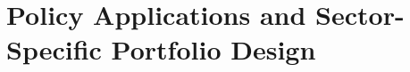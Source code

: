 %
%
%
%
%
%

\chapter{Policy Applications and Sector-Specific Portfolio Design}
\label{ch:policy-applications}

